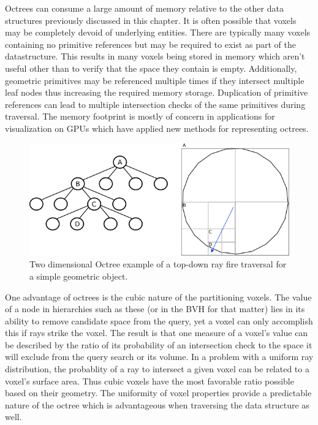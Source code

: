 \documentclass[12pt, a4paper]{article}
\begin{document}
Octrees can consume a large amount of memory relative to the other data structures previously discussed in this chapter. It is often possible that voxels may be completely devoid of underlying entities. There are typically many voxels containing no primitive references but may be required to exist as part of the datastructure. This results in many voxels being stored in memory which aren't useful other than to verify that the space they contain is empty. Additionally, geometric primitives may be referenced multiple times if they intersect multiple leaf nodes thus increasing the required memory storage. Duplication of primitive references can lead to multiple intersection checks of the same primitives during traversal. The memory footprint is mostly of concern in applications for visualization on GPUs which have applied new methods for representing octrees.



\begin{figure}[H]
  \centering
  \includegraphics[scale=0.65]{octree_2d_ex.png}
  \caption{Two dimensional Octree example of a top-down ray fire traversal for a simple geometric object.}
  \label{octree_2d_ex}
\end{figure}

One advantage of octrees is the cubic nature of the partitioning voxels. The value of a node in hierarchies such as these (or in the BVH for that matter) lies in its ability to remove candidate space from the query, yet a voxel can only accomplish this if rays strike the voxel. The result is that one measure of a voxel's value can be described by the ratio of its probability of an intersection check to the space it will exclude from the query search or its volume. In a problem with a uniform ray distribution, the probablity of a ray to intersect a given voxel can be related to a voxel's surface area. Thus cubic voxels have the most favorable ratio possible based on their geometry. The uniformity of voxel properties provide a predictable nature of the octree which is advantageous when traversing the data structure as well. 
\end{document}
